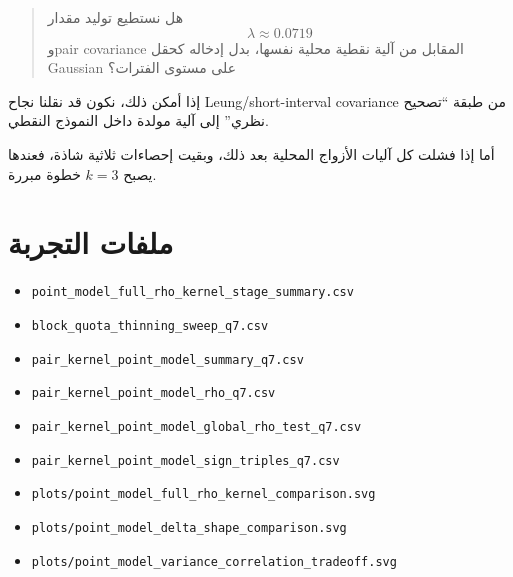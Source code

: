 \documentclass[12pt]{article}
\begin{document}
\begin{quote}
هل نستطيع توليد مقدار
\[
\lambda\approx0.0719
\]
وpair covariance المقابل من آلية نقطية محلية نفسها، بدل إدخاله كحقل Gaussian
على مستوى الفترات؟
\end{quote}

إذا أمكن ذلك، نكون قد نقلنا نجاح Leung/short-interval covariance من
طبقة ``تصحيح نظري'' إلى آلية مولدة داخل النموذج النقطي.

أما إذا فشلت كل آليات الأزواج المحلية بعد ذلك، وبقيت إحصاءات ثلاثية شاذة،
فعندها يصبح \(k=3\) خطوة مبررة.

\section{ملفات التجربة}

\begin{itemize}
\item \texttt{point\_model\_full\_rho\_kernel\_stage\_summary.csv}
\item \texttt{block\_quota\_thinning\_sweep\_q7.csv}
\item \texttt{pair\_kernel\_point\_model\_summary\_q7.csv}
\item \texttt{pair\_kernel\_point\_model\_rho\_q7.csv}
\item \texttt{pair\_kernel\_point\_model\_global\_rho\_test\_q7.csv}
\item \texttt{pair\_kernel\_point\_model\_sign\_triples\_q7.csv}
\item \texttt{plots/point\_model\_full\_rho\_kernel\_comparison.svg}
\item \texttt{plots/point\_model\_delta\_shape\_comparison.svg}
\item \texttt{plots/point\_model\_variance\_correlation\_tradeoff.svg}
\end{itemize}
\end{document}
